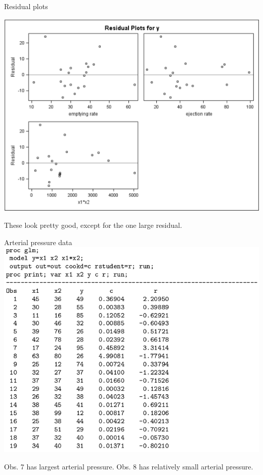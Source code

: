 \documentclass{beamer}
\begin{document}
\begin{frame}{Residual plots}
\centerline{\includegraphics[scale=0.30]{plots/bp-res}}
\vspace{10pt}

These look pretty good, except for the one large residual.
\end{frame}

\begin{frame}{Arterial pressure data}
\includegraphics[scale=0.33]{plots/bp-cookd}
\vspace{10pt}

Obs. 7 has largest arterial pressure. Obs. 8 has relatively small arterial pressure.
\end{frame}
\end{document}
